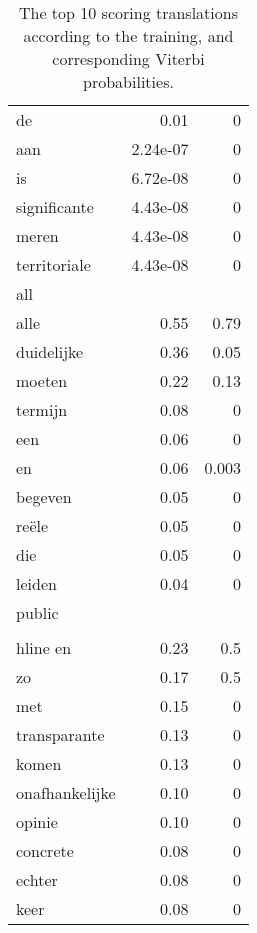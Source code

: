 \begin{table}
\begin{tabular}{l r r}
de		&0.01		&0\\
aan		&2.24e-07	&0\\
is		&6.72e-08	&0\\
significante	&4.43e-08	&0\\
meren		&4.43e-08	&0\\
territoriale	&4.43e-08	&0\\\hline\hline
%
all&&\\\hline
alle		&0.55	&0.79\\
duidelijke	&0.36	&0.05\\
moeten	&0.22	&0.13\\
termijn	&0.08	&0\\
een		&0.06	&0\\
en		&0.06	&0.003\\
begeven	&0.05	&0\\
re\"ele	&0.05	&0\\
die		&0.05	&0\\
leiden		&0.04	&0\\\hline\hline
%
public	&&\\\\hline
en			&0.23		&0.5\\
zo			&0.17		&0.5\\
met			&0.15		&0\\
transparante		&0.13		&0\\
komen			&0.13		&0\\
onafhankelijke	&0.10		&0\\
opinie			&0.10		&0\\
concrete		&0.08		&0\\
echter			&0.08		&0\\
keer			&0.08		&0\\
%
\end{tabular}
\caption{The top 10 scoring translations according to the training, and corresponding Viterbi probabilities.}
\end{table}
